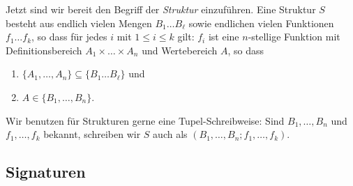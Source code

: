 \documentclass{article}
\begin{document}
Jetzt sind wir bereit den Begriff der \emph{Struktur} einzuführen. Eine 
Struktur $S$ besteht aus endlich vielen Mengen $B_1\ldots B_\ell$ sowie 
endlichen vielen Funktionen $f_1\ldots f_k$, so dass für jedes $i$ mit $1\leq 
i\leq k$ gilt: $f_i$ ist eine $n$-stellige Funktion mit Definitionsbereich 
$A_1\times\ldots\times A_n$ und Wertebereich $A$, so dass
\begin{enumerate}
 \item $\{A_1,\ldots,A_n\}\subseteq\{B_1\ldots B_\ell\}$ und 
 \item $A\in\{B_1,\ldots,B_n\}$.  
\end{enumerate}

Wir benutzen für Strukturen gerne eine Tupel-Schreibweise: Sind 
$B_1,\ldots,B_n$ und $f_1,\ldots,f_k$ bekannt, schreiben wir $S$ auch als 
$(B_1,\ldots,B_n;f_1,\ldots,f_k)$. 

\subsection{Signaturen}
\end{document}
